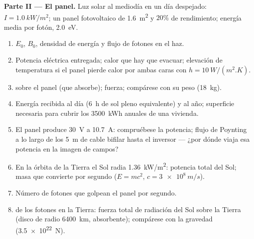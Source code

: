 \begin{problem}
\medskip
\noindent\textbf{Parte II --- El panel.}
Luz solar al mediodía en un día despejado: $I = \qty{1.0}{kW/m^2}$; un panel
fotovoltaico de \qty{1.6}{m^2} y $20\%$ de rendimiento; energía media por
fotón, \qty{2.0}{eV}.
\begin{enumerate}[resume]
  \item $E_0$, $B_0$, densidad de energía y flujo de fotones en el haz.
  \item Potencia eléctrica entregada; calor que hay que evacuar;
        elevación de temperatura si el panel pierde calor por ambas caras
        con $h = \qty{10}{W/(m^2.K)}$.
  \item {} sobre el panel (que absorbe); fuerza;
        compárese con su peso (\qty{18}{kg}).
  \item Energía recibida al día (\qty{6}{h} de sol pleno equivalente) y al
        año; superficie necesaria para cubrir los \qty{3500}{kWh} anuales
        de una vivienda.
  \item El panel produce \qty{30}{V} a \qty{10.7}{A}: compruébese la
        potencia; flujo de Poynting a lo largo de los \qty{5}{m} de cable
        bifilar hasta el inversor --- ¿por dónde viaja esa potencia en la
        imagen de campos?
  \item En la órbita de la Tierra el Sol radia \qty{1.36}{kW/m^2}: potencia
        total del Sol; masa que convierte por segundo ($E = mc^2$,
        $c = \qty{3e8}{m/s}$).
  \item Número de fotones que golpean el panel por segundo.
  \item {} de los fotones en la Tierra:
        fuerza total de radiación del Sol sobre la Tierra (disco de radio
        \qty{6400}{km}, absorbente); compárese con la gravedad (\qty{3.5e22}{N}).
\end{enumerate}


\end{problem}
